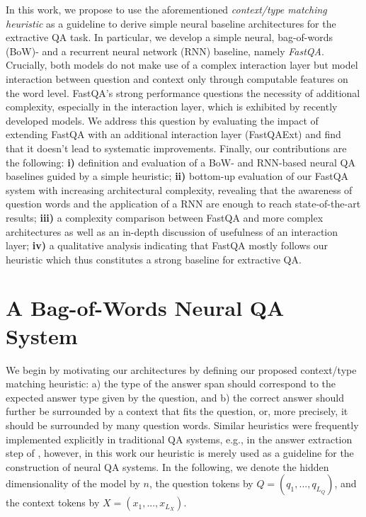 \documentclass[11pt,a4paper]{article}
\begin{document}
In this work, we propose to use the aforementioned \textit{context/type matching heuristic} as a guideline to derive simple neural baseline architectures for the extractive QA task. In particular, we develop a simple neural, bag-of-words (BoW)- and a recurrent neural network (RNN) baseline, namely \textit{FastQA}. Crucially, both models do not make use of a complex interaction layer but model interaction between question and context only through computable features on the word level. FastQA's strong performance questions the necessity of additional complexity, especially in the interaction layer, which is exhibited by recently developed models. We address this question by evaluating the impact of extending FastQA with an additional interaction layer (FastQAExt) and find that it doesn't lead to systematic improvements. Finally, our contributions are the following: \textbf{i)} definition and evaluation of a BoW- and RNN-based neural QA baselines guided by a simple heuristic; \textbf{ii)} bottom-up evaluation of our FastQA system with increasing architectural complexity, revealing that the awareness of question words and the application of a RNN are enough to reach state-of-the-art results; \textbf{iii)} a complexity comparison between FastQA and more complex architectures as well as an in-depth discussion of usefulness of an interaction layer; \textbf{iv)} a qualitative analysis indicating that FastQA mostly follows our heuristic which thus constitutes a strong baseline for extractive QA.


\section{A Bag-of-Words Neural QA System}\label{sec:fast_qa}

We begin by motivating our architectures by defining our proposed context/type matching heuristic: a) the type of the answer span should correspond to the expected answer type given by the question, and b) the correct answer should further be surrounded by a context that fits the question, or, more precisely, it should be surrounded by many question words. Similar heuristics were frequently implemented explicitly in traditional QA systems, e.g., in the answer extraction step of , however, in this work our heuristic is merely used as a guideline for the construction of neural QA systems. In the following, we denote the hidden dimensionality of the model by $n$, the question tokens by $Q=(q_1, ..., q_{L_Q})$, and the context tokens by $X=(x_1, ..., x_{L_X})$.
\end{document}
